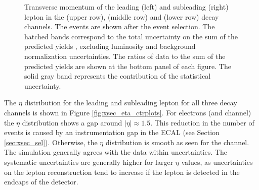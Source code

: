 \begin{figure}[htbp!]
\begin{center}
      \caption{Transverse momentum of the leading (left) and subleading (right)
        lepton in the \emu (upper row), \mumu (middle row) and \ee (lower row) decay channels.
        The events are shown after the
        event selection.  The hatched
        bands correspond to the total uncertainty on the sum of the
        predicted yields 
        , excluding luminosity and background
        normalization uncertainties. 
        The ratios of data to the sum of the predicted yields are
        shown at the bottom panel of each figure. The solid gray band
        represents the contribution of the statistical uncertainty.}  
       \label{fig:xsec_pt_ctrplots}
  \end{center}
\end{figure}

The $\eta$ distribution for the leading and subleading lepton for all three decay channels is shown in Figure \ref{fig:xsec_eta_ctrplots}.
For electrons (\emu and \ee channel) the $\eta$ distribution shows a gap around $|\eta| \approx 1.5$. This reduction in the number of events is caused by an instrumentation gap in the ECAL (see Section \ref{sec:xsec_sel}).
Otherwise, the $\eta$ distribution is smooth as seen for the \mumu channel.
The simulation generally agrees with the data within uncertainties. The systematic uncertainties are generally higher for larger $\eta$ values, as uncertainties on the lepton reconstruction
tend to increase if the lepton is detected in the endcaps of the detector.


